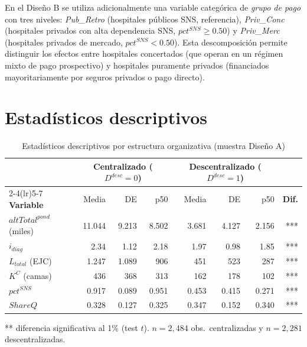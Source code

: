 \documentclass[12pt, a4paper, twoside, openright]{book}
\theoremstyle{plain}
\theoremstyle{definition}
\theoremstyle{remark}
\begin{document}
En el Diseño B se utiliza adicionalmente una variable categórica de \textit{grupo de pago} con tres niveles: \textit{Pub\_Retro} (hospitales públicos SNS, referencia), \textit{Priv\_Conc} (hospitales privados con alta dependencia SNS, $pct^{SNS}\geq 0.50$) y \textit{Priv\_Merc} (hospitales privados de mercado, $pct^{SNS}<0.50$). Esta descomposición permite distinguir los efectos entre hospitales concertados (que operan en un régimen mixto de pago prospectivo) y hospitales puramente privados (financiados mayoritariamente por seguros privados o pago directo).

\section{Estadísticos descriptivos}

\begin{table}[htbp]
\centering
\caption{Estadísticos descriptivos por estructura organizativa (muestra Diseño A)}
\label{tab:descriptivos}
\begin{threeparttable}
\small
\begin{tabular}{lrrrrrrr}
\toprule
& \multicolumn{3}{c}{\textbf{Centralizado ($D^{desc}=0$)}}
& \multicolumn{3}{c}{\textbf{Descentralizado ($D^{desc}=1$)}} & \\
\cmidrule(lr){2-4}\cmidrule(lr){5-7}
\textbf{Variable} & Media & DE & p50
  & Media & DE & p50 & \textbf{Dif.} \\
\midrule
$altTotal^{pond}$ (miles) & 11.044 & 9.213 & 8.502
  & 3.681 & 4.127 & 2.156 & *** \\
$i_{diag}$ & 2.34 & 1.12 & 2.18
  & 1.97 & 0.98 & 1.85 & *** \\
$L_{total}$ (EJC) & 1.247 & 1.089 & 906
  & 451 & 523 & 287 & *** \\
$K^C$ (camas) & 436 & 368 & 313
  & 162 & 178 & 102 & *** \\
$pct^{SNS}$ & 0.917 & 0.089 & 0.951
  & 0.453 & 0.415 & 0.271 & *** \\
$ShareQ$ & 0.328 & 0.127 & 0.325
  & 0.347 & 0.152 & 0.340 & *** \\
\bottomrule
\end{tabular}
\begin{tablenotes}
  \small
  \item *** diferencia significativa al 1\% (test $t$). $n = 2{,}484$ obs.\ centralizadas y $n = 2{,}281$ descentralizadas.
\end{tablenotes}
\end{threeparttable}
\end{table}
\end{document}
